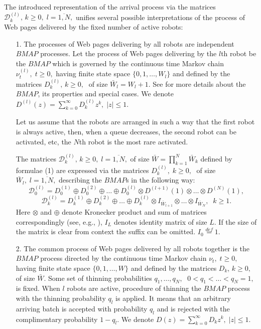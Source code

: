 \documentclass[11pt]{article}
\begin{document}
The introduced representation of the arrival process via the matrices
${\mathcal D}_k^{(l)},\,k\geq 0,\;l=\overline{1,N},$ unifies several
possible interpretations of the process of Web pages delivered by
the fixed number of active robots:
\begin{itemize}
\item[1.] The processes of Web pages delivering by all robots are
independent $BMAP$ processes. Let the process of Web pages
delivering by the $l$th robot be the $BMAP$ which is governed by the
continuous time Markov chain $\nu_t^{(l)}, \; t \ge 0,$  having
finite state space $\{0,1,\dots,W_l\}$ and defined by the matrices
$D_k^{(l)},\,k\geq 0,\;$ of size $\bar W_l=W_l+1.$  See \cite{l} for
more details about the $BMAP$, its properties and special cases. We
denote $D^{(l)}(z)=\sum\limits_{k=0}^{\infty} D_k^{(l)} z^k,\;|z|
\le 1.$

Let us assume that the robots are arranged in such a way that the
first robot is always active, then, when a queue decreases, the
second robot can be activated, etc, the $N$th robot is the most rare
activated.

The matrices  ${\mathcal D}_k^{(l)},\,k\geq 0,\;l=\overline{1,N},$
of size $\bar W = \prod\limits_{k=1}^{N} \bar W_k$ defined by
formulae (1) are expressed via the matrices $D_k^{(l)},\;k\geq 0,\;$
of size $\bar W_l,\;l=\overline{1,N},$ describing the $BMAP$s in the
following way:
$$
{\mathcal D}^{(l)}_0=D_0^{(1)}\oplus D_0^{(2)}\oplus \dots \oplus
D_0^{(l)}\otimes D^{(l+1)}(1)\otimes \dots \otimes D^{(N)}(1),
$$
$$
{\mathcal D}^{(l)}_k=D_k^{(1)}\oplus D_k^{(2)}\oplus \dots \oplus
D_k^{(l)}\otimes I_{\bar W_{l+1}}\otimes \dots \otimes I_{\bar
W_{N}},\;\; k \ge 1.$$ Here $\otimes$ and $\oplus$ denote Kronecker
product and sum of matrices correspondingly (see, e.g.,
\cite{grah}), $I_L$ denotes identity matrix of size $L.$ If the size
of the matrix is clear from context the suffix can be omitted.
$I_0\stackrel{def}{=}1.$

\item[2.] The common process of Web pages delivered by all robots 
together is the $BMAP$ process
directed by the   continuous time Markov chain $\nu_t, \; t \ge 0,$
having finite state space $\{0,1,\dots,W\}$ and defined by the
matrices $D_k,\,k\geq 0,\;$ of size $\bar W.$ Some set of thinning
probabilities $q_1,\dots,q_N,\;$ $0< q_1 < \dots < q_N=1,\;$ is
fixed. When $l$ robots are active, procedure of thinning the $BMAP$
process with the thinning probability $q_l$ is applied. It means
that an arbitrary arriving batch is accepted with probability $q_l$
and is rejected with the complimentary probability $1-q_l.$ We
denote $D(z)=\sum\limits_{k=0}^{\infty} D_k z^k,\;|z| \le 1.$


\end{itemize}
\end{document}
